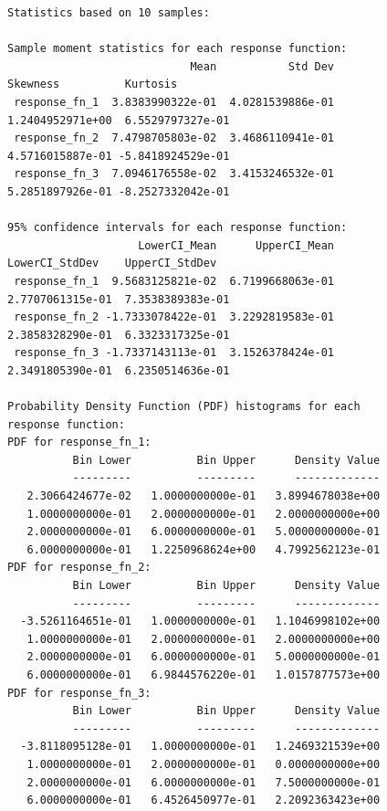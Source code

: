 \begin{figure}[htbp!]
\centering
\begin{bigbox}
\begin{small}
\begin{verbatim}
Statistics based on 10 samples:

Sample moment statistics for each response function:
                            Mean           Std Dev          Skewness          Kurtosis
 response_fn_1  3.8383990322e-01  4.0281539886e-01  1.2404952971e+00  6.5529797327e-01
 response_fn_2  7.4798705803e-02  3.4686110941e-01  4.5716015887e-01 -5.8418924529e-01
 response_fn_3  7.0946176558e-02  3.4153246532e-01  5.2851897926e-01 -8.2527332042e-01

95% confidence intervals for each response function:
                    LowerCI_Mean      UpperCI_Mean    LowerCI_StdDev    UpperCI_StdDev
 response_fn_1  9.5683125821e-02  6.7199668063e-01  2.7707061315e-01  7.3538389383e-01
 response_fn_2 -1.7333078422e-01  3.2292819583e-01  2.3858328290e-01  6.3323317325e-01
 response_fn_3 -1.7337143113e-01  3.1526378424e-01  2.3491805390e-01  6.2350514636e-01

Probability Density Function (PDF) histograms for each response function:
PDF for response_fn_1:
          Bin Lower          Bin Upper      Density Value
          ---------          ---------      -------------
   2.3066424677e-02   1.0000000000e-01   3.8994678038e+00
   1.0000000000e-01   2.0000000000e-01   2.0000000000e+00
   2.0000000000e-01   6.0000000000e-01   5.0000000000e-01
   6.0000000000e-01   1.2250968624e+00   4.7992562123e-01
PDF for response_fn_2:
          Bin Lower          Bin Upper      Density Value
          ---------          ---------      -------------
  -3.5261164651e-01   1.0000000000e-01   1.1046998102e+00
   1.0000000000e-01   2.0000000000e-01   2.0000000000e+00
   2.0000000000e-01   6.0000000000e-01   5.0000000000e-01
   6.0000000000e-01   6.9844576220e-01   1.0157877573e+00
PDF for response_fn_3:
          Bin Lower          Bin Upper      Density Value
          ---------          ---------      -------------
  -3.8118095128e-01   1.0000000000e-01   1.2469321539e+00
   1.0000000000e-01   2.0000000000e-01   0.0000000000e+00
   2.0000000000e-01   6.0000000000e-01   7.5000000000e-01
   6.0000000000e-01   6.4526450977e-01   2.2092363423e+00


\end{verbatim}
\end{small}
\end{bigbox}
\end{figure}
